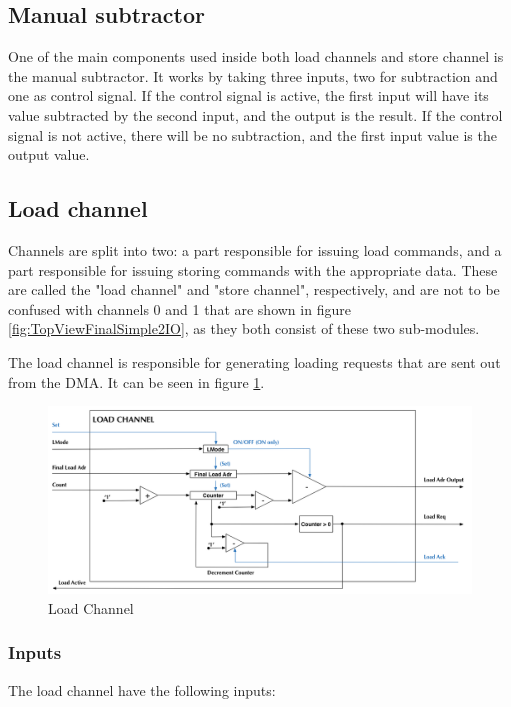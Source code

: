 \begin{appendix}
\subsection{Manual subtractor}
One of the main components used inside both load channels and store channel is the manual subtractor.
It works by taking three inputs, two for subtraction and one as control signal.
If the control signal is active, the first input will have its value subtracted by the second input, and the output is the result.
If the control signal is not active, there will be no subtraction, and the first input value is the output value. 

\subsection{Load channel}
Channels are split into two: 
a part responsible for issuing load commands, and a part responsible for issuing storing commands with the appropriate data.
These are called the "load channel" and "store channel", respectively, and are not to be confused with channels 0 and 1 that are shown in figure \ref{fig:TopViewFinalSimple2IO}, as they both consist of these two sub-modules.
  
The load channel is responsible for generating loading requests that are sent out from the DMA.
It can be seen in figure \ref{fig:loadChannel}.

\begin{figure}[h!]
    \centering
    \includegraphics[width=1.0\textwidth]{Figures/DMA/LoadChannel}
    \caption{Load Channel}
    \label{fig:loadChannel}
\end{figure}

\subsubsection{Inputs}
The load channel have the following inputs:


\end{appendix}
